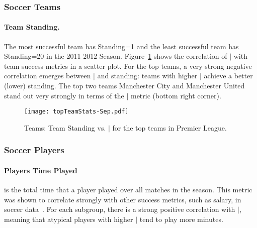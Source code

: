 {	
	

			
\subsubsection{Soccer Teams} 
\paragraph{Team Standing.}
	The most successful team has Standing=1 and the least successful team has Standing=20 in the 2011-2012 Season. Figure~\ref{fig:TeamStandingELD} shows the correlation of $\mid$ with team success metrics in a scatter plot. For the top teams, a very strong negative correlation emerges between $\mid$ and standing: teams with higher $\mid$ achieve a better (lower) standing. 
	 The top two teams Manchester City and Manchester United stand out very strongly in terms of the $\mid$ metric (bottom right corner).

\begin{figure}[t]
	\centering
	\texttt{[image: topTeamStats-Sep.pdf]}
	
	\caption{Teams: Team Standing vs. $\mid$ for the top teams in Premier League. 
		\label{fig:TeamStandingELD}}
\end{figure}

\subsubsection{Soccer Players}

	\paragraph{Players Time Played} is the total time that a player played over all matches in the season. This metric was shown to correlate strongly with other success metrics, such as salary, in soccer data~\citep{schwartz}. 
%	
%	
	For each subgroup, there is a strong positive correlation with $\mid$, meaning that atypical players with higher $\mid$ tend to play more minutes.
	
}
